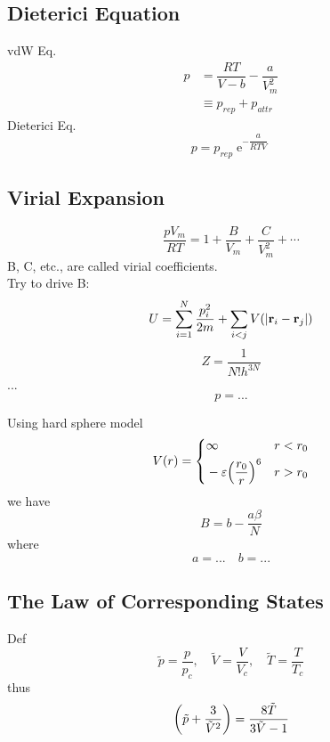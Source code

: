\documentclass[UTF8]{ctexart} %
\DeclareMathOperator{\e}{\mathrm{e}}
\numberwithin{equation}{subsection}
\begin{document}
\subsection{Dieterici Equation}
vdW Eq.
\begin{equation}\label{key}
\begin{aligned}
p &= \dfrac{RT}{V -b} - \dfrac{a}{V_m^2}\\
&\equiv p_{rep} + p_{attr}
\end{aligned}
\end{equation}
Dieterici Eq.
\begin{equation}\label{key}
p = p_{rep}\e^{-\dfrac{a}{RTV}}
\end{equation}

\subsection{Virial Expansion}
\begin{equation}\label{key}
\dfrac{pV_m}{RT} = 1 + \dfrac{B}{V_m} + \dfrac{C}{V_m^2} + \cdots
\end{equation}
B, C, etc., are called virial coefficients.\\
Try to drive B:
\begin{equation}\label{key}
U = \sum_{i=1}^N\dfrac{p_i^2}{2m} + \sum_{i<j}V(\abs{\vb{r}_i - \vb{r}_j})
\end{equation}
\begin{equation}\label{key}
Z = \dfrac{1}{N!h^{3N}}
\end{equation}
...
\begin{equation}\label{key}
p = ...
\end{equation}

Using hard sphere model
\begin{equation}\label{key}
V(r) = \left\{
\begin{aligned}
&\infty & r<r_0\\
&-\varepsilon\qty(\dfrac{r_0}{r})^6 & r>r_0
\end{aligned}\right.
\end{equation}
we have
\begin{equation}\label{key}
B = b - \dfrac{a\beta}{N}
\end{equation}
where
\begin{equation}\label{key}
a = ... \quad b = ...
\end{equation}

\subsection{The Law of Corresponding States}
Def
\begin{equation}\label{key}
\tilde{p} = \dfrac{p}{p_c},\quad \tilde{V} = \dfrac{V}{V_c},\quad \tilde{T} = \dfrac{T}{T_c}
\end{equation}
thus
\begin{equation}\label{key}
\qty(\tilde{p} + \dfrac{3}{\tilde{V}^2}) = \dfrac{8\tilde{T}}{3\tilde{V} - 1}
\end{equation}
\end{document}
